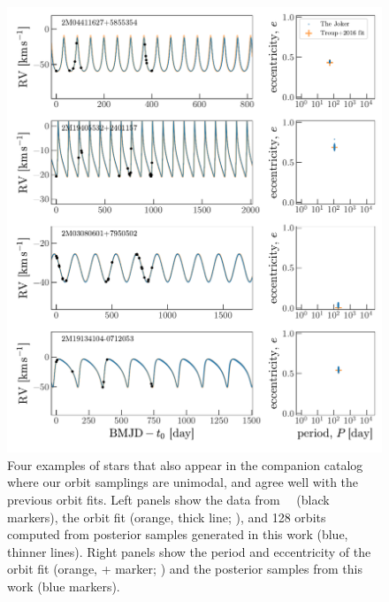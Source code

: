 \documentclass[modern, letterpaper]{aastex62}
\newcommand{\apogee}{\project{\acronym{APOGEE}}}
\newcommand{\DR}{\acronym{DR14}}
\begin{document}
\begin{figure}[h]
\begin{center}
\includegraphics[width=\textwidth]{troup-unimodal.pdf}
\end{center}
\caption{%
Four examples of stars that also appear in the \citet{Troup:2016} companion
catalog where our orbit samplings are unimodal, and agree well with the previous
orbit fits.
Left panels show the data from \apogee\ \DR\ (black markers), the orbit fit
(orange, thick line; \citealt{Troup:2016}), and 128 orbits computed from
posterior samples generated in this work (blue, thinner lines).
Right panels show the period and eccentricity of the orbit fit (orange, +
marker; \citealt{Troup:2016}) and the posterior samples from this work (blue
markers).
\label{fig:troup-unimodal}
}
\end{figure}
\end{document}
